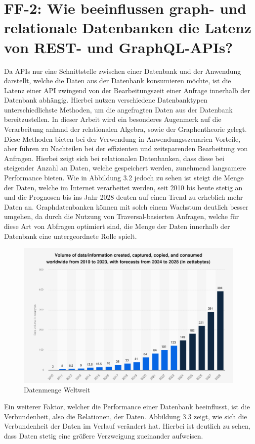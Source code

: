 \section{FF-2: Wie beeinflussen graph- und relationale Datenbanken die Latenz von REST- und GraphQL-APIs?} %
\label{sec:ff2}
Da APIs nur eine Schnittstelle zwischen einer Datenbank und der Anwendung darstellt, welche die Daten aus der Datenbank konsumieren möchte, ist die Latenz einer API zwingend von der Bearbeitungszeit einer Anfrage innerhalb der Datenbank abhängig. Hierbei nutzen verschiedene Datenbanktypen unterschiedlichste Methoden, um die angefragten Daten aus der Datenbank bereitzustellen. In dieser Arbeit wird ein besonderes Augenmerk auf die Verarbeitung anhand der relationalen Algebra, sowie der Graphentheorie gelegt. Diese Methoden bieten bei der Verwendung in Anwendungsszenarien Vorteile, aber führen zu Nachteilen bei der effizienten und zeitsparenden Bearbeitung von Anfragen. Hierbei zeigt sich bei relationalen Datenbanken, dass diese bei steigender Anzahl an Daten, welche gespeichert werden, zunehmend langsamere Performance bieten.
Wie in Abbildung 3.2 jedoch zu sehen ist steigt die Menge der Daten, welche im Internet verarbeitet werden, seit 2010 bis heute stetig an und die Prognosen bis ins Jahr 2028 deuten auf einen Trend zu erheblich mehr Daten an. Graphdatenbanken können mit solch einem Wachstum deutlich besser umgehen, da durch die Nutzung von Traversal-basierten Anfragen, welche für diese  Art von Abfragen optimiert sind, die Menge der Daten innerhalb der Datenbank eine untergeordnete Rolle spielt. \citep{9677042} \citep{performancenosql}
\begin{figure}[H]
	\centering
	\includegraphics[scale=.4]{Illustrations/growthofdata.png}
	\caption{Datenmenge Weltweit \citep{statista}}
\end{figure}
\noindent
Ein weiterer Faktor, welcher die Performance einer Datenbank beeinflusst, ist die Verbundenheit, also die Relationen, der Daten. Abbildung 3.3 zeigt, wie sich die Verbundenheit der Daten im Verlauf verändert hat. Hierbei ist deutlich zu sehen, dass Daten stetig eine größere Verzweigung zueinander aufweisen. 


